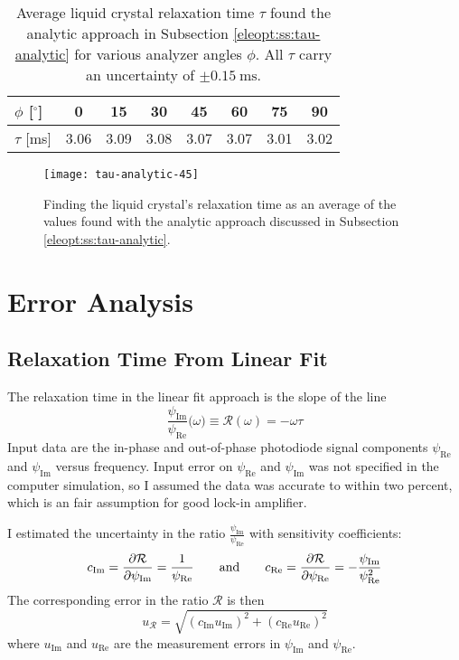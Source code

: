 \documentclass[11pt, a4paper]{article}
\newcommand{\eqtext}[1]{\qquad \text{#1} \qquad}
\begin{document}
\begin{table}
\centering
\begin{tabular}{l|c|c|c|c|c|c|c}
	$ \phi $ [$ ^{\circ} $] & 0 & 15 & 30 & 45 & 60 & 75 & 90\\
		\hline
	$ \tau $ [\si{\milli \second}] & 3.06 & 3.09 & 3.08 & 3.07 & 3.07 & 3.01 & 3.02\\
\end{tabular}
\caption{Average liquid crystal relaxation time $ \tau $ found the analytic approach in Subsection \ref{eleopt:ss:tau-analytic} for various analyzer angles $ \phi $. All $ \tau $ carry an uncertainty of $ \pm \SI{0.15}{\milli \second} $.  }

\end{table}

\begin{figure}[htb!]
\centering
\texttt{[image: tau-analytic-45]} \vfill

\caption{Finding the liquid crystal's relaxation time as an average of the values found with the analytic approach discussed in Subsection \ref{eleopt:ss:tau-analytic}.}
\label{eleopt:fig:tau-analytic}
\end{figure}

\section{Error Analysis}

\subsection{Relaxation Time From Linear Fit}
The relaxation time in the linear fit approach is the slope of the line
\begin{equation*}
	\frac{\psi_{\text{Im}}}{\psi_{\text{Re}}}\big(\omega\big) \equiv \mathcal{R}(\omega) = - \omega \tau
\end{equation*}
Input data are the in-phase and out-of-phase photodiode signal components $ \psi_{\text{Re}} $ and $ \psi_{\text{Im}} $ versus frequency. Input error on $ \psi_{\text{Re}} $ and $ \psi_{\text{Im}} $ was not specified in the computer simulation, so I assumed the data was accurate to within two percent, which is an fair assumption for good lock-in amplifier. 

I estimated the uncertainty in the ratio $ \frac{\psi_{\text{Im}}}{\psi_{\text{Re}}} $ with sensitivity coefficients:
\begin{equation*}
	c_{\text{Im}} = \pdv{\mathcal{R}}{\psi_{\text{Im}}} = \frac{1}{\psi_{\text{Re}}} \eqtext{and} c_{\text{Re}} = \pdv{\mathcal{R}}{\psi_{\text{Re}}} = -\frac{\psi_{\text{Im}}}{\psi^{2}_{\text{Re}}} 
\end{equation*}
The corresponding error in the ratio $ \mathcal{R} $ is then
\begin{equation*}
	u_{\mathcal{R}} = \sqrt{(c_{\text{Im}}u_{\text{Im}})^{2} + (c_{\text{Re}}u_{\text{Re}})^{2} }
\end{equation*} 
where $ u_{\text{Im}} $ and $ u_{\text{Re}} $ are the measurement errors in $ \psi_{\text{Im}} $ and $ \psi_{\text{Re}} $. 
\end{document}
